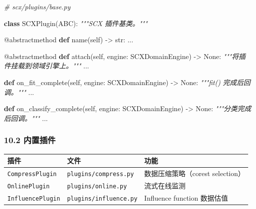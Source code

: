 \documentclass[
  12pt,
]{ctexart}
\newenvironment{Shaded}{}{}
\newcommand{\AttributeTok}[1]{\textcolor[rgb]{0.49,0.56,0.16}{#1}}
\newcommand{\BuiltInTok}[1]{\textcolor[rgb]{0.00,0.50,0.00}{#1}}
\newcommand{\CommentTok}[1]{\textcolor[rgb]{0.38,0.63,0.69}{\textit{#1}}}
\newcommand{\KeywordTok}[1]{\textcolor[rgb]{0.00,0.44,0.13}{\textbf{#1}}}
\newcommand{\NormalTok}[1]{#1}
\newcommand{\OperatorTok}[1]{\textcolor[rgb]{0.40,0.40,0.40}{#1}}
\newcommand{\VariableTok}[1]{\textcolor[rgb]{0.10,0.09,0.49}{#1}}
\begin{document}
\begin{Shaded}
\begin{Highlighting}[]
\CommentTok{\# scx/plugins/base.py}

\KeywordTok{class}\NormalTok{ SCXPlugin(ABC):}
    \CommentTok{"""SCX 插件基类。"""}

    \AttributeTok{@abstractmethod}
    \KeywordTok{def}\NormalTok{ name(}\VariableTok{self}\NormalTok{) }\OperatorTok{{-}\textgreater{}} \BuiltInTok{str}\NormalTok{: ...}

    \AttributeTok{@abstractmethod}
    \KeywordTok{def}\NormalTok{ attach(}\VariableTok{self}\NormalTok{, engine: SCXDomainEngine) }\OperatorTok{{-}\textgreater{}} \VariableTok{None}\NormalTok{:}
        \CommentTok{"""将插件挂载到领域引擎上。"""}
\NormalTok{        ...}

    \KeywordTok{def}\NormalTok{ on\_fit\_complete(}\VariableTok{self}\NormalTok{, engine: SCXDomainEngine) }\OperatorTok{{-}\textgreater{}} \VariableTok{None}\NormalTok{:}
        \CommentTok{"""fit() 完成后回调。"""}
\NormalTok{        ...}

    \KeywordTok{def}\NormalTok{ on\_classify\_complete(}\VariableTok{self}\NormalTok{, engine: SCXDomainEngine) }\OperatorTok{{-}\textgreater{}} \VariableTok{None}\NormalTok{:}
        \CommentTok{"""分类完成后回调。"""}
\NormalTok{        ...}
\end{Highlighting}
\end{Shaded}

\subsubsection{10.2 内置插件}\label{ux5185ux7f6eux63d2ux4ef6}

\begin{longtable}[]{@{}
  >{\raggedright\arraybackslash}p{}
  >{\raggedright\arraybackslash}p{}
  >{\raggedright\arraybackslash}p{}@{}}
\toprule\noalign{}
\begin{minipage}[b]{\linewidth}\raggedright
插件
\end{minipage} & \begin{minipage}[b]{\linewidth}\raggedright
文件
\end{minipage} & \begin{minipage}[b]{\linewidth}\raggedright
功能
\end{minipage} \\
\midrule\noalign{}
\endhead
\bottomrule\noalign{}
\endlastfoot
\texttt{CompressPlugin} & \texttt{plugins/compress.py} &
数据压缩策略（corest selection） \\
\texttt{OnlinePlugin} & \texttt{plugins/online.py} & 流式在线监测 \\
\texttt{InfluencePlugin} & \texttt{plugins/influence.py} & Influence
function 数据估值 \\
\end{longtable}
\end{document}
